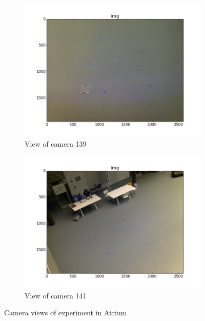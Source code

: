 \begin{figure}[H]
    \centering
    \begin{subfigure}{0.49\linewidth}
        \includegraphics[width=\linewidth]{files/res0_img139.png}
        \caption{View of camera 139 }
        \label{fig:res0_img139}
    \end{subfigure}
    \begin{subfigure}{0.49\linewidth}
        \includegraphics[width=\linewidth]{files/res0_img141.png}
        \caption{View of camera 141 }
        \label{fig:res0_img141}
    \end{subfigure}
    \caption{Camera views of experiment in Atrium}
    \label{fig:res0_views}
\end{figure}


